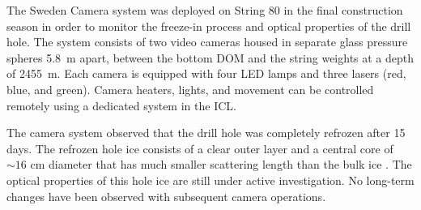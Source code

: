 The Sweden Camera system was deployed on String 80 in the final
construction season in order to monitor the freeze-in process and optical
properties of the drill hole.  The system consists of two video cameras
housed in separate glass pressure spheres \SI{5.8}{m} apart, between the
bottom DOM and the string weights at a depth of \SI{2455}{m}.  Each
camera is equipped with four LED lamps and three lasers (red, blue, and
green).  Camera heaters, lights, and movement can be controlled remotely
using a dedicated system in the ICL.  

The camera system observed that the drill hole was completely refrozen after
15 days.  The refrozen hole ice consists of a clear outer
layer and a central core of $\sim16$ cm diameter that has much
smaller scattering length than the bulk ice \cite{rongen_vlvnt15}.  The
optical properties of this hole ice are still under active investigation.
No long-term changes have been observed with subsequent camera operations.
